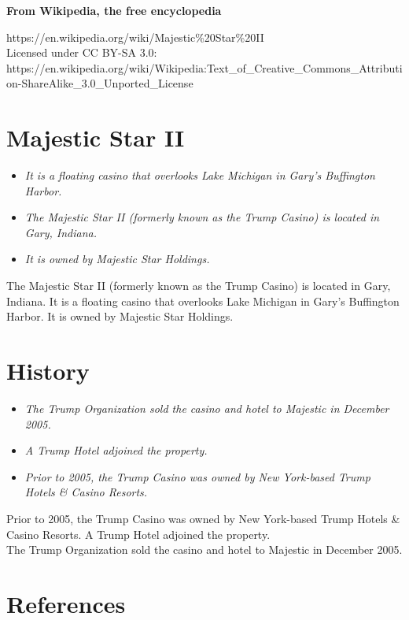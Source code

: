 \textbf{From Wikipedia, the free encyclopedia}

https://en.wikipedia.org/wiki/Majestic\%20Star\%20II\\
Licensed under CC BY-SA 3.0:\\
https://en.wikipedia.org/wiki/Wikipedia:Text\_of\_Creative\_Commons\_Attribution-ShareAlike\_3.0\_Unported\_License

\section{Majestic Star II}\label{majestic-star-ii}

\begin{itemize}
\item
  \emph{It is a floating casino that overlooks Lake Michigan in Gary's
  Buffington Harbor.}
\item
  \emph{The Majestic Star II (formerly known as the Trump Casino) is
  located in Gary, Indiana.}
\item
  \emph{It is owned by Majestic Star Holdings.}
\end{itemize}

The Majestic Star II (formerly known as the Trump Casino) is located in
Gary, Indiana. It is a floating casino that overlooks Lake Michigan in
Gary's Buffington Harbor. It is owned by Majestic Star Holdings.

\section{History}\label{history}

\begin{itemize}
\item
  \emph{The Trump Organization sold the casino and hotel to Majestic in
  December 2005.}
\item
  \emph{A Trump Hotel adjoined the property.}
\item
  \emph{Prior to 2005, the Trump Casino was owned by New York-based
  Trump Hotels \& Casino Resorts.}
\end{itemize}

Prior to 2005, the Trump Casino was owned by New York-based Trump Hotels
\& Casino Resorts. A Trump Hotel adjoined the property.\\
The Trump Organization sold the casino and hotel to Majestic in December
2005.

\section{References}\label{references}

